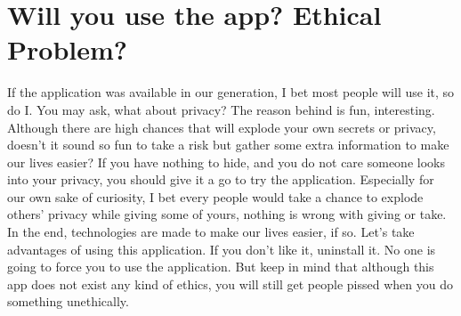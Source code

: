 \documentclass[12pt]{article}
\begin{document}
\section{Will you use the app? Ethical Problem?}
If the application was available in our generation, I bet most people will use it, so do I. You may ask, what about privacy? The reason behind is fun, interesting. Although there are high chances that will explode your own secrets or privacy, doesn't it sound so fun to take a risk but gather some extra information to make our lives easier? If you have nothing to hide, and you do not care someone looks into your privacy, you should give it a go to try the application. Especially for our own sake of curiosity, I bet every people would take a chance to explode others' privacy while giving some of yours, nothing is wrong with giving or take. In the end, technologies are made to make our lives easier, if so. Let's take advantages of using this application. If you don't like it, uninstall it. No one is going to force you to use the application. But keep in mind that although this app does not exist any kind of ethics, you will still get people pissed when you do something unethically.
\newpage


\cite{*}
\end{document}
